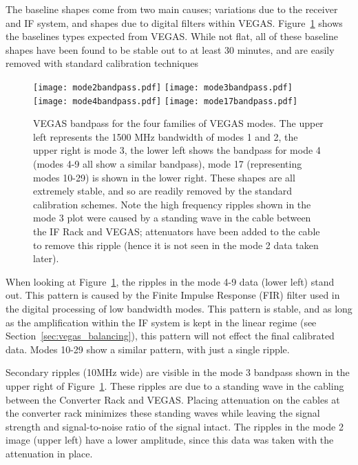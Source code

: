 The baseline shapes come from two main causes; variations due to the 
receiver and IF system, and shapes due to digital filters within VEGAS. 
Figure~\ref{basicbaselines} shows the baselines types expected from VEGAS. 
While not flat, all of these baseline shapes have been found to be stable 
out to at least 30 minutes, and are easily removed with standard 
calibration techniques

\begin{figure}
\texttt{[image: mode2bandpass.pdf]}
\texttt{[image: mode3bandpass.pdf]}
\texttt{[image: mode4bandpass.pdf]}
\texttt{[image: mode17bandpass.pdf]}
\caption[VEGAS bandpass for the four families of VEGAS modes]
{VEGAS bandpass for the four families of VEGAS modes. The upper 
left represents the 1500 MHz bandwidth of modes 1 and 2, the upper right is 
mode 3, the lower left shows the bandpass for mode 4 (modes 4-9 all show a 
similar bandpass), mode 17 (representing modes 10-29) is shown in the 
lower right. These shapes are all extremely stable, and so are readily 
removed by the standard calibration schemes. Note the high frequency 
ripples shown in the mode 3 plot were caused by a standing wave in the 
cable between the IF Rack and VEGAS; attenuators have been added to the cable
 to remove this ripple (hence it is not seen in the mode 2 data taken later).\label{basicbaselines}} 

\end{figure}

When looking at Figure~\ref{basicbaselines}, the ripples in the mode 4-9 data 
(lower left) stand out. This pattern is caused by the Finite Impulse Response
(FIR) filter used in the digital processing of low bandwidth modes. This 
pattern is stable, and as long as the amplification within the IF system is 
kept in the linear regime (see Section~\ref{sec:vegas_balancing}), 
this pattern will not effect the final calibrated data. Modes 10-29 show 
a similar pattern, with just a single ripple.

Secondary ripples (10MHz wide) are visible in the mode 3 bandpass shown in 
the upper right of Figure~\ref{basicbaselines}. These ripples are due to a 
standing wave in the cabling between the Converter Rack and VEGAS. 
Placing attenuation on the cables at the converter rack minimizes these 
standing waves while leaving the signal strength and 
signal-to-noise ratio of the signal intact. The ripples in the mode 2 
image (upper left) have a lower amplitude, since this data was taken with the 
attenuation in place.

